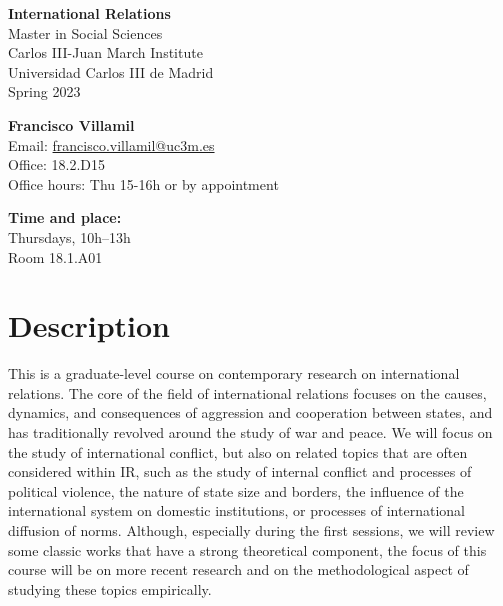 \documentclass[12pt, a4paper]{article}
\begin{document}
\begin{center}
{\LARGE\bf International Relations}\\\vspace{10pt}
Master in Social Sciences\\
Carlos III-Juan March Institute\\Universidad Carlos III de Madrid\\\vspace{10pt}
{\large Spring 2023}\\
\end{center}

\vspace{20pt}

\begin{minipage}{0.49\textwidth}
\textbf{Francisco Villamil}\\
Email: \href{francisco.villamil@uc3m.es}{francisco.villamil@uc3m.es}\\
Office: 18.2.D15\\Office hours: Thu 15-16h or by appointment\\
\end{minipage}\hfill
\begin{minipage}{0.49\textwidth}
\centering
\textbf{Time and place:}\\
Thursdays, 10h--13h\\Room 18.1.A01\\
\end{minipage}


\vspace{10pt}
\section{Description}

This is a graduate-level course on contemporary research on international relations. The core of the field of international relations focuses on the causes, dynamics, and consequences of aggression and cooperation between states, and has traditionally revolved around the study of war and peace.
We will focus on the study of international conflict, but also on related topics that are often considered within IR, such as the study of internal conflict and processes of political violence, the nature of state size and borders, the influence of the international system on domestic institutions, or processes of international diffusion of norms.
Although, especially during the first sessions, we will review some classic works that have a strong theoretical component, the focus of this course will be on more recent research and on the methodological aspect of studying these topics empirically.
\end{document}
